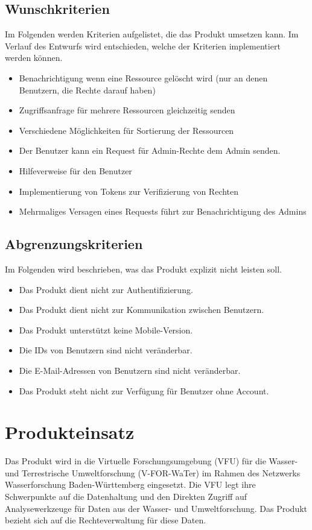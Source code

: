 \documentclass[parskip=full,11pt]{scrartcl}
\begin{document}
\subsection{Wunschkriterien}
Im Folgenden werden Kriterien aufgelistet, die das Produkt umsetzen kann.
Im Verlauf des Entwurfs wird entschieden, welche der Kriterien  implementiert werden können.
\begin{itemize}[itemsep=0pt]
\item Benachrichtigung wenn eine Ressource gelöscht wird (nur an denen Benutzern, die Rechte darauf haben) 
\item Zugriffsanfrage für mehrere Ressourcen gleichzeitig senden
\item Verschiedene Möglichkeiten für Sortierung der Ressourcen
\item Der Benutzer kann ein Request für Admin-Rechte dem Admin senden.
\item Hilfeverweise für den Benutzer
\item Implementierung von Tokens zur Verifizierung von Rechten
\item Mehrmaliges Versagen eines Requests führt zur Benachrichtigung des Admins
\end{itemize}

\subsection{Abgrenzungskriterien}
Im Folgenden wird beschrieben, was das Produkt explizit nicht leisten soll.
\begin{itemize}[itemsep=0pt]
\item Das Produkt dient nicht zur Authentifizierung.
\item Das Produkt dient nicht zur Kommunikation zwischen Benutzern.
\item Das Produkt unterstützt keine Mobile-Version.
\item Die IDs von Benutzern sind nicht veränderbar.
\item Die E-Mail-Adressen von Benutzern sind nicht veränderbar.
\item Das Produkt steht nicht zur Verfügung für Benutzer ohne Account.
\end{itemize}


\section{Produkteinsatz}
Das Produkt wird in die Virtuelle Forschungsumgebung (VFU) für die Wasser-
und Terrestrische Umweltforschung (V-FOR-WaTer) im Rahmen des Netzwerks
Wasserforschung Baden-Württemberg eingesetzt. Die VFU legt ihre Schwerpunkte
auf die Datenhaltung und den Direkten Zugriff auf Analysewerkzeuge für Daten
aus der Wasser- und Umweltforschung. Das Produkt bezieht sich auf die
Rechteverwaltung für diese Daten.
\end{document}
